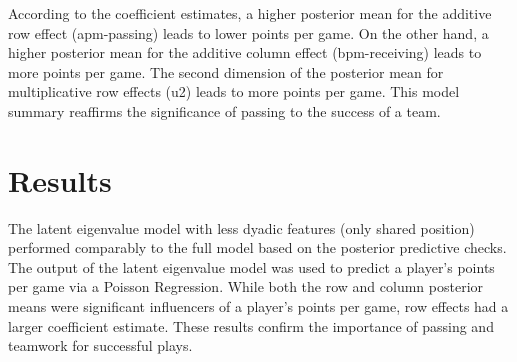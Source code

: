 \documentclass[12pt,twoside]{dukestatscithesis}
\theoremstyle{definition}
\theoremstyle{definition}
\theoremstyle{definition}
\theoremstyle{remark}
\begin{document}
According to the coefficient estimates, a higher posterior mean for the
additive row effect (apm-passing) leads to lower points per game. On the
other hand, a higher posterior mean for the additive column effect
(bpm-receiving) leads to more points per game. The second dimension of
the posterior mean for multiplicative row effects (u2) leads to more
points per game. This model summary reaffirms the significance of
passing to the success of a team.

\section{Results}\label{results-1}

The latent eigenvalue model with less dyadic features (only shared
position) performed comparably to the full model based on the posterior
predictive checks. The output of the latent eigenvalue model was used to
predict a player's points per game via a Poisson Regression. While both
the row and column posterior means were significant influencers of a
player's points per game, row effects had a larger coefficient estimate.
These results confirm the importance of passing and teamwork for
successful plays.
\end{document}

